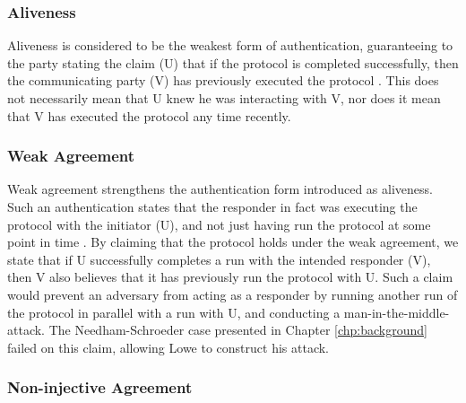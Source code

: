 


\subsubsection{Aliveness}

Aliveness is considered to be the weakest form of authentication, guaranteeing to the party stating the claim (U) that if the protocol is completed successfully, then the communicating party (V) has previously executed the protocol \cite{lowe1997hierarchy}. This does not necessarily mean that U knew he was interacting with V, nor does it mean that V has executed the protocol any time recently.


\subsubsection{Weak Agreement}

Weak agreement strengthens the authentication form introduced as aliveness. Such an authentication states that the responder in fact was executing the protocol with the initiator (U), and not just having run the protocol at some point in time \cite{lowe1997hierarchy}. By claiming that the protocol holds under the weak agreement, we state that if U successfully completes a run with the intended responder (V), then V also believes that it has previously run the protocol with U. Such a claim would prevent an adversary from acting as a responder by running another run of the protocol in parallel with a run with U, and conducting a man-in-the-middle-attack. The Needham-Schroeder case presented in Chapter \ref{chp:background} failed on this claim, allowing Lowe to construct his attack. 


\subsubsection{Non-injective Agreement}

